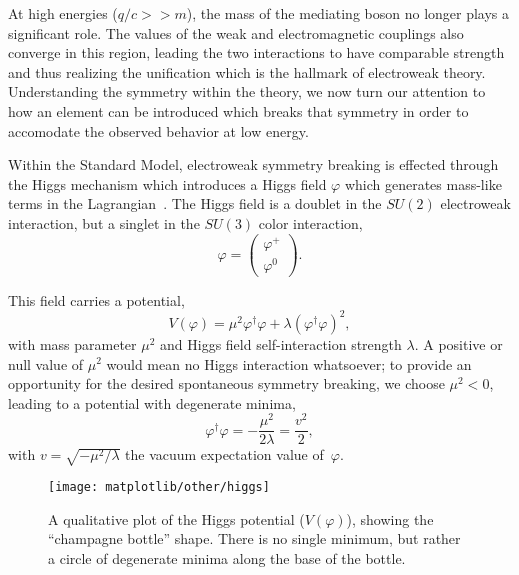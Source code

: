 At high energies ($q/c >> m$), the mass of the mediating boson no longer plays a significant role.  The values of the weak and electromagnetic couplings also converge in this region, leading the two interactions to have comparable strength and thus realizing the unification which is the hallmark of electroweak theory.  Understanding the symmetry within the theory, we now turn our attention to how an element can be introduced which breaks that symmetry in order to accomodate the observed behavior at low energy.

Within the Standard Model, electroweak symmetry breaking is effected through the Higgs mechanism which introduces a Higgs field $\varphi$ which generates mass-like terms in the Lagrangian~\cite{PhysRevLett.13.508,PhysRevLett.13.321,PhysRevLett.13.585}.  The Higgs field is a doublet in the $SU(2)$ electroweak interaction, but a singlet in the $SU(3)$ color interaction,
\begin{equation}
  \varphi = \left(\begin{array}{c}\varphi^+ \\ \varphi^0\end{array}\right).
\end{equation}

This field carries a potential,
\begin{equation}
  V(\varphi) = \mu^2\varphi^\dagger\varphi + \lambda(\varphi^\dagger\varphi)^2,
\end{equation}
with mass parameter $\mu^2$ and Higgs field self-interaction strength $\lambda$.  A positive or null value of $\mu^2$ would mean no Higgs interaction whatsoever; to provide an opportunity for the desired spontaneous symmetry breaking, we choose $\mu^2 < 0$, leading to a potential with degenerate minima,
\begin{equation}
  \varphi^\dagger\varphi = -\frac{\mu^2}{2\lambda} = \frac{v^2}{2},
\end{equation}
with $v=\sqrt{-\mu^2/\lambda}$ the vacuum expectation value of~$\varphi$.

\begin{figure}
\centering
\texttt{[image: matplotlib/other/higgs]}
\caption[The Higgs potential]{A qualitative plot of the Higgs potential ($V(\varphi)$), showing the ``champagne bottle'' shape.  There is no single minimum, but rather a circle of degenerate minima along the base of the bottle.}
\label{higgs-potential}
\end{figure}

